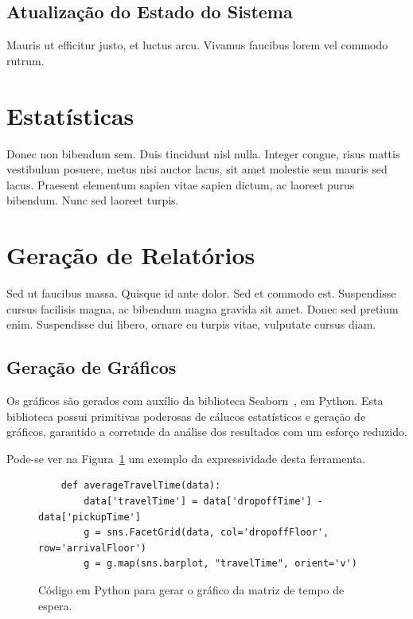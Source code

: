 \subsection{Atualização do Estado do Sistema}

Mauris ut efficitur justo, et luctus arcu. Vivamus faucibus lorem vel commodo
rutrum.

\section{Estatísticas}

Donec non bibendum sem. Duis tincidunt nisl nulla. Integer congue, risus mattis
vestibulum posuere, metus nisi auctor lacus, sit amet molestie sem mauris sed
lacus. Praesent elementum sapien vitae sapien dictum, ac laoreet purus bibendum.
Nunc sed laoreet turpis.

\section{Geração de Relatórios}

Sed ut faucibus massa. Quisque id ante dolor. Sed et commodo est. Suspendisse
cursus facilisis magna, ac bibendum magna gravida sit amet. Donec sed pretium
enim. Suspendisse dui libero, ornare eu turpis vitae, vulputate cursus diam.

\subsection{Geração de Gráficos}

Os gráficos são gerados com auxílio da biblioteca Seaborn~\cite{seaborn}, em Python.
Esta biblioteca possui primitivas poderosas de cálucos estatísticos e geração de
gráficos, garantido a corretude da análise dos resultados com um esforço reduzido.

Pode-se ver na Figura~\ref{fig:seaborn} um exemplo da expressividade desta ferramenta.

\begin{figure}[htb]
  \centering
    \begin{verbatim}
    def averageTravelTime(data):
        data['travelTime'] = data['dropoffTime'] - data['pickupTime']
        g = sns.FacetGrid(data, col='dropoffFloor', row='arrivalFloor')
        g = g.map(sns.barplot, "travelTime", orient='v')
    \end{verbatim}
  \caption{Código em Python para gerar o gráfico da matriz de tempo de espera.}
  \label{fig:seaborn}
\end{figure}

